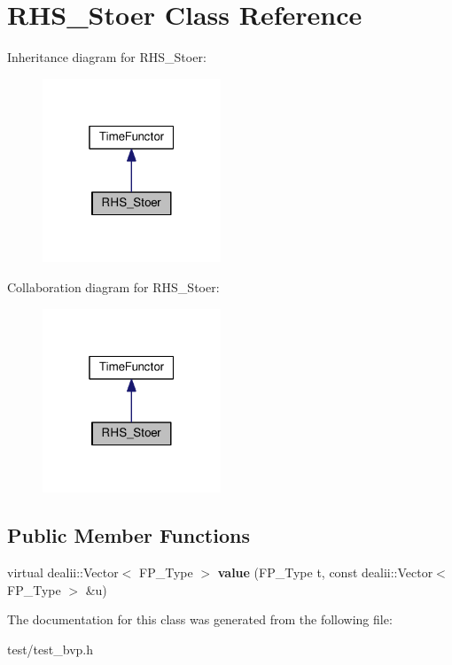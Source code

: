 \hypertarget{classRHS__Stoer}{}\section{R\+H\+S\+\_\+\+Stoer Class Reference}
\label{classRHS__Stoer}


Inheritance diagram for R\+H\+S\+\_\+\+Stoer\+:\nopagebreak
\begin{figure}[H]
\begin{center}
\leavevmode
\includegraphics[width=151pt]{classRHS__Stoer__inherit__graph}
\end{center}
\end{figure}


Collaboration diagram for R\+H\+S\+\_\+\+Stoer\+:\nopagebreak
\begin{figure}[H]
\begin{center}
\leavevmode
\includegraphics[width=151pt]{classRHS__Stoer__coll__graph}
\end{center}
\end{figure}
\subsection*{Public Member Functions}
\begin{DoxyCompactItemize}
\item 
\mbox{\label{classRHS__Stoer_a24f15a7ea2415e55c6a98f238bedc2ff}} 
virtual dealii\+::\+Vector$<$ F\+P\+\_\+\+Type $>$ {\bfseries value} (F\+P\+\_\+\+Type t, const dealii\+::\+Vector$<$ F\+P\+\_\+\+Type $>$ \&u)
\end{DoxyCompactItemize}


The documentation for this class was generated from the following file\+:\begin{DoxyCompactItemize}
\item 
test/test\+\_\+bvp.\+h\end{DoxyCompactItemize}
